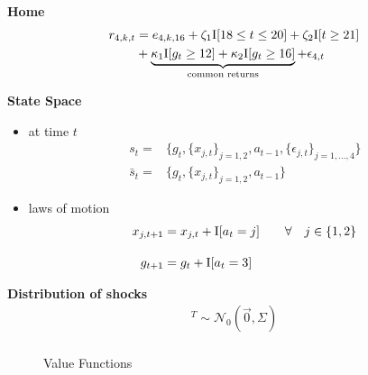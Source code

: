 \begin{frame}
\textbf{Home}
\begin{align*}
r_{4,k,t} & = e_{4,k,16} + \zeta_{1} \mathrm{I}[18 \leq t \leq 20] +  \zeta_{2} \mathrm{I}[t \geq 21] \\
          & + \underbrace{\kappa_{1}\mathrm{I}[g_t \geq 12] + \kappa_{2} \mathrm{I}[g_t \geq 16]}_{\text{common returns}} + \epsilon_{4,t}
\end{align*}
\end{frame}
\begin{frame}
\textbf{State Space}\vspace{0.3cm}
\begin{itemize}
\item at time $t$
\begin{align*}
s_t  = & \{g_t,  \{x_{j, t}\}_{j=1,2}, a_{t-1}, \{\epsilon_{j, t}\}_{j=1,\hdots,4}\}\\
\bar{s}_t  = & \{g_t,  \{x_{j, t}\}_{j=1,2}, a_{t-1}\}
\end{align*}
\item laws of motion
\begin{align*}
x_{j,t + 1} & = x_{j,t} + \mathrm{I}[a_t = j]  \qquad\forall\quad j \in \{1, 2\}  \\[1em]
g_{t + 1}    & = g_t + \mathrm{I}[a_t = 3]
\end{align*}
\end{itemize}
\end{frame}
\begin{frame}

\textbf{Distribution of shocks}
\begin{align*}
[\epsilon_{1,t}, \epsilon_{2,t}, \epsilon_{3,t}, \epsilon_{4,t}]^T \sim \mathcal{N}_0(\vec{0}, \Sigma)\\
\end{align*}

\end{frame}
\begin{frame}
\begin{figure}\caption{Value Functions}
\end{figure}
\end{frame}
